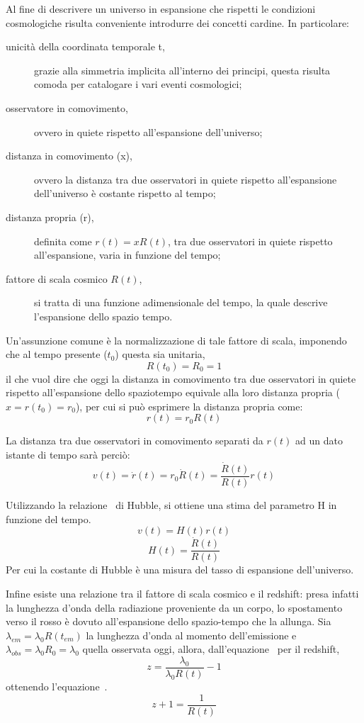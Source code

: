 Al fine di descrivere un universo in espansione che rispetti le condizioni cosmologiche risulta conveniente introdurre dei concetti cardine. In particolare:
\begin{description}
    \item[unicità della coordinata temporale t,] grazie alla simmetria implicita all'interno dei principi, questa risulta comoda per catalogare i vari eventi cosmologici;
    \item[osservatore in comovimento,] ovvero in quiete rispetto all'espansione dell'universo;
    \item[distanza in comovimento (x),] ovvero la distanza tra due osservatori in quiete rispetto all'espansione dell'universo è costante rispetto al tempo;
    \item[distanza propria (r),] definita come $r(t) = x R(t)$, tra due osservatori in quiete rispetto all'espansione, varia in funzione del tempo;
    \item[fattore di scala cosmico $R(t)$,] si tratta di una funzione adimensionale del tempo, la quale descrive l'espansione dello spazio tempo.
\end{description}

Un'assunzione comune è la normalizzazione di tale fattore di scala, imponendo che al tempo presente ($t_0$) questa sia unitaria,
\[
    R(t_0) = R_0 = 1
\]
il che vuol dire che oggi la distanza in comovimento tra due osservatori in quiete rispetto all'espansione dello spaziotempo equivale alla loro distanza propria ($x = r(t_0) = r_0$), per cui si può esprimere la distanza propria come:
\[
    r(t)= r_0 R(t)
\]

La distanza tra due osservatori in comovimento separati da $r(t)$ ad un dato istante di tempo sarà perciò:
\begin{equation}\label{eq:hubble-speed}
    v(t) = \dot{r}(t) = r_0 \dot{R}(t) = \frac{\dot{R}(t)}{R(t)}r(t)
\end{equation}

Utilizzando la relazione~ di Hubble, si ottiene una stima del parametro H in funzione del tempo.
\[
    v(t) = H(t)r(t)
\]
\begin{equation}\label{eq:hubble-scale}
    H(t) = \frac{\dot{R}(t)}{R(t)}
\end{equation}
Per cui la costante di Hubble è una misura del tasso di espansione dell'universo.

Infine esiste una relazione tra il fattore di scala cosmico e il redshift: presa infatti la lunghezza d'onda della radiazione proveniente da un corpo, lo spostamento verso il rosso è dovuto all'espansione dello spazio-tempo che la allunga. Sia $\lambda_{em} = \lambda_0 R(t_{em})$ la lunghezza d'onda al momento dell'emissione e $\lambda_{obs} = \lambda_0 R_0 = \lambda_0$ quella osservata oggi, allora, dall'equazione~ per il redshift,
\[
    z = \frac{\lambda_0}{\lambda_0 R(t)}-1
\]
ottenendo l'equazione~.
\begin{equation}\label{eq:redshift-rescale}
    z + 1 = \frac{1}{R(t)} 
\end{equation}
